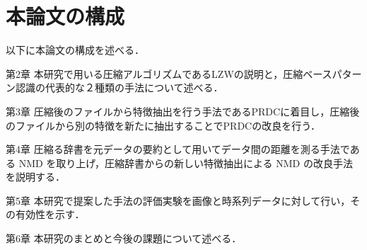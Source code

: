 \section{本論文の構成} %
\label{sec:本論文の構成}
以下に本論文の構成を述べる．

\begin{description}
	\item{第2章} 本研究で用いる圧縮アルゴリズムであるLZWの説明と，圧縮ベースパターン認識の代表的な２種類の手法について述べる．
	\item{第3章} 圧縮後のファイルから特徴抽出を行う手法であるPRDCに着目し，圧縮後のファイルから別の特徴を新たに抽出することでPRDCの改良を行う．
	\item{第4章} 圧縮る辞書を元データの要約として用いてデータ間の距離を測る手法である NMD を取り上げ，圧縮辞書からの新しい特徴抽出による NMD の改良手法を説明する．
	\item{第5章} 本研究で提案した手法の評価実験を画像と時系列データに対して行い，その有効性を示す．
	\item{第6章} 本研究のまとめと今後の課題について述べる．
\end{description}
